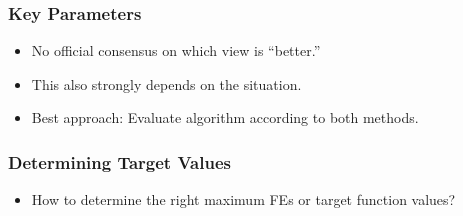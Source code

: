 \documentclass[mathserif]{beamer}%
\begin{document}
%
\begin{frame}%
\frametitle{Key Parameters}%
\begin{itemize}%
\item No official consensus on which view is ``better.''%
\item<2-> This also strongly depends on the situation.%
\item<3-> Best approach: Evaluate algorithm according to both methods.\cite{WCTLTCMY2014BOAAOSFFTTSP,WNT2010AAOAB,WWQLT2018ADCOAAPIBAWATCFEDASAIF}%
\end{itemize}%
\end{frame}%
%
\begin{frame}%
\frametitle{Determining Target Values}%
\begin{itemize}%
\item How to determine the right maximum FEs or target function values?%
\end{itemize}%
\end{frame}%
%
\end{document}
